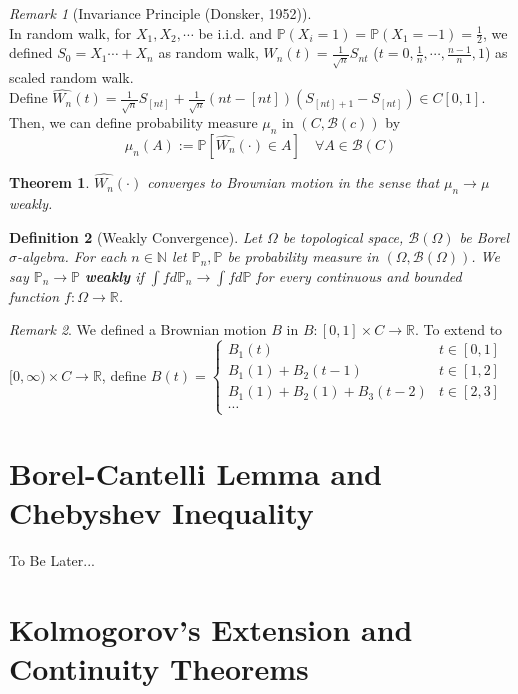 \documentclass[12pt]{report}
\newcommand{\R}{\mathbb{R}}
\renewcommand{\P}{\mathbb{P}}
\renewcommand{\1}{\mathbb{1}}
\renewcommand{\O}{\Omega}
\theoremstyle{break}
\newtheorem{thm}{Theorem}[section] %
\theoremstyle{newdef}
\newtheorem{defn}[thm]{Definition} %
\theoremstyle{remark}
\newtheorem*{rem}{Remark} %
\begin{document}
\begin{rem}[Invariance Principle (Donsker, 1952)]
\leavevmode\\
In random walk, for $X_1, X_2, \cdots$ be i.i.d. and $\P(X_i = 1) = \P(X_1 = -1) = \frac{1}{2}$,
we defined $S_0 = X_1 \cdots + X_n$ as random walk, $W_n(t) = \frac{1}{\sqrt n}S_{nt}$ ($t = 0,\frac{1}{n},\cdots,\frac{n-1}{n},1$) as scaled random walk.\\
Define $\widehat{W_n}(t) = \frac{1}{\sqrt{n}}S_{[nt]} + \frac{1}{\sqrt n} (nt - [nt])(S_{[nt]+1} - S_{[nt]}) \in C[0,1]$.
Then, we can define probability measure $\mu_n$ in $(C,\mathcal{B}(c))$ by
$$\mu_n(A) := \P \left[ \widehat{W_n}(\cdot) \in A\right] \quad \forall A \in \mathcal{B}(C)$$
\end{rem}


\begin{thm}
$\widehat{W_n}(\cdot)$ converges to Brownian motion in the sense that $\mu_n \rightarrow \mu$ weakly.
\end{thm}

\begin{defn}[Weakly Convergence]
Let $\O$ be topological space, $\mathcal{B}(\O)$ be Borel $\sigma$-algebra.
For each $n \in \mathbb{N}$ let $\P_n, \P$ be probability measure in $(\O,\mathcal{B}(\O))$.
We say $\P_n \rightarrow \P$ \textbf{weakly} if $\int fd\P_n \rightarrow \int fd\P$ for every continuous and bounded function $f : \O \rightarrow \R$.
\end{defn}


\begin{rem}
We defined a Brownian motion $B$ in $B : [0,1] \times C \rightarrow \R$.
To extend to $[0,\infty) \times C \rightarrow \R$, define
$B(t) =
\begin{cases}
B_1(t) & t \in [0,1]\\
B_1(1) + B_2(t-1) & t \in [1,2]\\
B_1(1) + B_2(1)  + B_3(t-2)& t \in [2,3]\\
\cdots
\end{cases}
$
\end{rem}

\section{Borel-Cantelli Lemma and Chebyshev Inequality}
To Be Later...

\section{Kolmogorov's Extension and Continuity Theorems}
\end{document}
